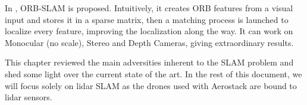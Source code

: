      In \cite{murTRO2015}, ORB-SLAM is proposed. Intuitively, it creates ORB features from a visual input and stores it in a sparse matrix, then a matching process is launched to localize every feature, improving the localization along the way. It can work on Monocular (no scale), Stereo and Depth Cameras, giving extraordinary results.

  This chapter reviewed the main adversities inherent to the SLAM problem and shed some light over the current state of the art. In the rest of this document, we will focus solely on lidar SLAM as the drones used with Aerostack are bound to lidar sensors. 

